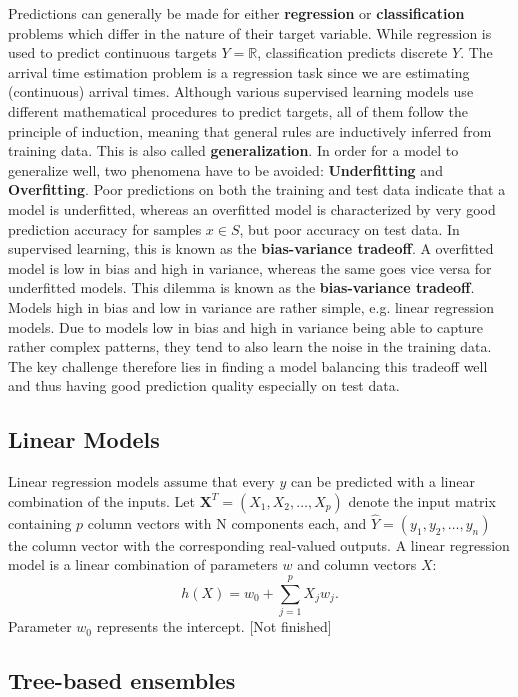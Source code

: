 Predictions can generally be made for either \textbf{regression} or \textbf{classification} problems which differ in the nature of their target variable. 
While regression is used to predict continuous targets $ Y = \mathbb{R} $, classification predicts discrete $ Y $. The arrival time estimation problem is a regression task since we are estimating (continuous) arrival times.
Although various supervised learning models use different mathematical procedures to predict targets, all of them follow the principle of induction, meaning that general rules are inductively inferred from training data. This is also called \textbf{generalization}.  
In order for a model to generalize well, two phenomena have to be avoided: \textbf{Underfitting} and \textbf{Overfitting}. 
Poor predictions on both the training and test data indicate that a model is underfitted, whereas an overfitted model is characterized by very good prediction accuracy for samples $ x \in S $, but poor accuracy on test data.
In supervised learning, this is known as the \textbf{bias-variance tradeoff}. 
A overfitted model is low in bias and high in variance, whereas the same goes vice versa for underfitted models. This dilemma is known as the \textbf{bias-variance tradeoff}. Models high in bias and low in variance are rather simple, e.g. linear regression models. Due to models low in bias and high in variance being able to capture rather complex patterns, they tend to also learn the noise in the training data. 
The key challenge therefore lies in finding a model balancing this tradeoff well and thus having good prediction quality especially on test data. 
 
\subsection{Linear Models}

Linear regression models assume that every $ y $ can be predicted with a linear combination of the inputs. 
Let $ \textbf{X}^{T} = (X_1, X_2, \dots, X_p) $ denote the input matrix containing $ p $ column vectors with N components each, and $ \hat{Y} = (y_1, y_2, \dots, y_n)$ the column vector with the corresponding real-valued outputs. A linear regression model is a linear combination of parameters $ w $ and column vectors $ X $:
\begin{equation}
h(X) = w_0 + \sum_{j=1}^{p} X_jw_j.
\end{equation}
Parameter $ w_0 $ represents the intercept. [Not finished]

\subsection{Tree-based ensembles}

